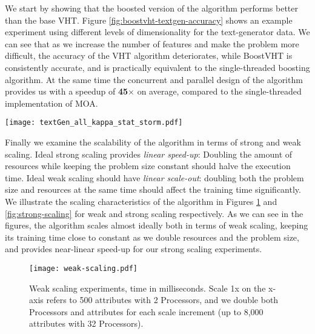 We start by showing that the boosted version of the algorithm performs
better than the base VHT. Figure \ref{fig:boostvht-textgen-accuracy} shows an example experiment using different
levels of dimensionality for the text-generator data. We can see
that as we increase the number of features and make the problem more
difficult, the accuracy of the VHT algorithm deteriorates, while
BoostVHT is consistently accurate, and is practically equivalent to the single-threaded
boosting algorithm. At the same time the concurrent and parallel design of the algorithm
provides us with a speedup of \textbf{45$\times$} on average, compared to the single-threaded
implementation of MOA.

\begin{figure*}
	\centering
	\texttt{[image: textGen\_all\_kappa\_stat\_storm.pdf]}
	\caption{Kappa statistic (accuracy) as a function of arriving instances over time for text generator datasets with
		an increasing number of attributes.}
	\label{fig:boostvht-textgen-accuracy}
\end{figure*}

Finally we examine the scalability of the algorithm in terms of strong and weak scaling.
Ideal strong scaling provides \emph{linear speed-up}: Doubling the amount of resources
while keeping the problem size constant should halve the execution time.
Ideal weak scaling should have \emph{linear scale-out}: doubling both the problem size
and resources at the same time should affect the training time significantly.
We illustrate the scaling characteristics of the algorithm in Figures
\ref{fig:weak-scaling} and \ref{fig:strong-scaling} for weak and strong
scaling respectively. As we can see in the figures, the algorithm scales
almost ideally both in terms of weak scaling, keeping its training time
close to constant as we double resources and the problem size, and provides
near-linear speed-up for our strong scaling experiments.

\begin{figure}
	\centering
	\texttt{[image: weak-scaling.pdf]}
	\caption{Weak scaling experiments, time in milliseconds. Scale 1x on the x-axis refers to 500 attributes with 2 Processors, and we double both Processors and attributes for each scale increment (up to 8,000 attributes with 32 Processors).}
	\label{fig:weak-scaling}
\end{figure}

